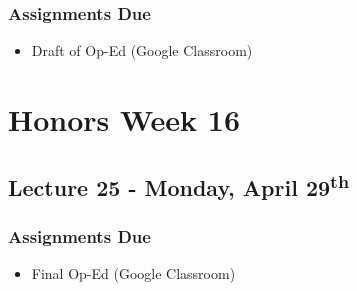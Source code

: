 \documentclass[]{book}
\providecommand{\tightlist}{%
  \setlength{\itemsep}{0pt}\setlength{\parskip}{0pt}}
\begin{document}
\hypertarget{assignments-due-11}{%
\subsubsection*{Assignments Due}\label{assignments-due-11}}

\begin{itemize}
\tightlist
\item
  Draft of Op-Ed (Google Classroom)
\end{itemize}

\hypertarget{honors-week-16}{%
\section*{Honors Week 16}\label{honors-week-16}}

\hypertarget{lecture-25---monday-april-29th-1}{%
\subsection*{\texorpdfstring{Lecture 25 - Monday, April 29\textsuperscript{th}}{Lecture 25 - Monday, April 29th}}\label{lecture-25---monday-april-29th-1}}

\hypertarget{assignments-due-12}{%
\subsubsection*{Assignments Due}\label{assignments-due-12}}

\begin{itemize}
\tightlist
\item
  Final Op-Ed (Google Classroom)
\end{itemize}


\end{document}
